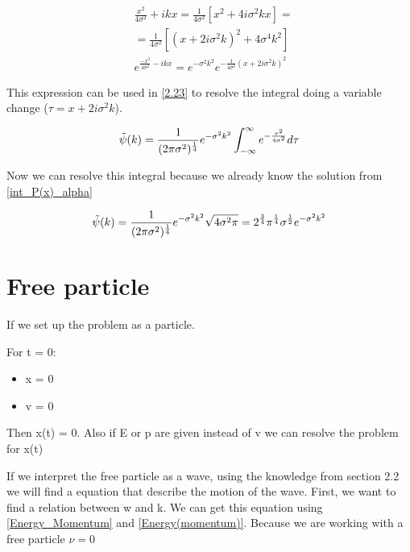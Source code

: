 \begin{equation}
    \label{eq_2.24}
    \begin{split}
    & \frac{x^2}{4\sigma^2}+ikx = \frac{1}{4\sigma^2}[x^2+4i\sigma^2 k x] =
    \\
    & = \frac{1}{4\sigma^2}[(x+2i\sigma^2k)^2+4\sigma^4k^2]
    \\
    & e^{\frac{-x^2}{4\sigma^2}-ikx} = e^{-\sigma^2k^2}e^{-\frac{1}{4\sigma^2}(x+2i\sigma^2k)^2}
    \end{split}
\end{equation}

This expression can be used in \ref{2.23} to resolve the integral doing a variable change ($\tau = x+2i\sigma^2k$).

\begin{equation}
    \label{2.25}
    \Tilde{\psi}(k) = \frac{1}{(2\pi\sigma^2)^{\frac{1}{4}} } e^{-\sigma^2k^2} \int_{-\infty}^{\infty} e^{-\frac{\tau^2}{4\sigma^2}} d\tau
\end{equation}


Now we can resolve this integral because we already know the solution from \ref{int_P(x)_alpha}

\begin{equation}
    \label{2.26}
    \Tilde{\psi}(k) = \frac{1}{(2\pi\sigma^2)^{\frac{1}{4}} } e^{-\sigma^2k^2} \sqrt{4\sigma^2\pi} = 2^{\frac{3}{4}}\pi^{\frac{1}{4}}\sigma^{\frac{1}{2}} e^{-\sigma^2k^2}
\end{equation}

\section{Free particle}

If we set up the problem as a particle.

For t = 0:
    \begin{itemize}
        \item x = 0
        \item v = 0
    \end{itemize}

Then x(t) = 0. Also if E or p are given instead of v we can resolve the problem for x(t)

If we interpret the free particle as a wave, using the knowledge from section 2.2 we will find a equation that describe the motion of the wave. First, we want to find a relation between w and k. We can get this equation using \ref{Energy_Momentum} and \ref{Energy(momentum)}. Because we are working with a free particle $\nu = 0$



